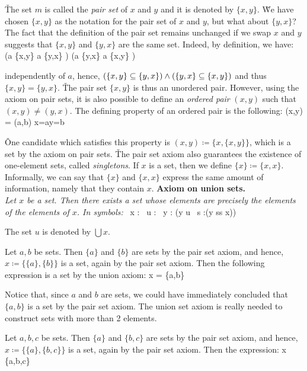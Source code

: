 \v

The set $m$ is called the \emph{pair set} of $x$ and $y$ and it is denoted by $\{x,y\}$. \v

We have chosen $\{x,y\}$ as the notation for the pair set of $x$ and $y$, but what about $\{y,x\}$? The fact that the
definition of the pair set remains unchanged if we swap $x$ and $y$ suggests that $\{x,y\}$ and $\{y,x\}$ are the
same set. Indeed, by definition, we have:
\bse
(a \in \{x,y\} \imp a \in \{y,x\} ) \land (a \in \{y,x\} \imp a \in \{x,y\} )
\ese

independently of $a$, hence, $(\{x,y\} \subseteq \{y,x\}) \land (\{y,x\} \subseteq \{x, y\})$ and thus $\{x,y\} = \{y,x\}$. \v

The pair set $\{x,y\}$ is thus an unordered pair. However, using the axiom on pair sets, it is also possible to
define an \emph{ordered pair} $(x,y)$ such that $(x,y)\neq(y,x)$. The defining property of an ordered pair is the
following:
\bse
(x,y) = (a,b) \eqv x=a\land y=b
\ese

\v

One candidate which satisfies this property is $(x,y)\coloneqq\{x,\{x, y\}\}$, which is a set by the axiom on pair
sets. \v

The pair set axiom also guarantees the existence of one-element sets, called \emph{singletons}. If
$x$ is a set, then we define $\{x\}\coloneqq\{x,x\}$. Informally, we can say that $\{x\}$ and $\{x,x\}$ express the
same amount of information, namely that they contain $x$. \v

\textbf{Axiom on union sets.} \\
\emph{Let $x$ be a set. Then there exists a set whose elements are precisely the elements of the elements of $x$. In
symbols:}
\bse
\forall \, x : \exists \, u : \forall \, y : (y \in u \eqv \exists \, s :(y \in s\land s \in x))
\ese

The set $u$ is denoted by $\bigcup x$.

\be Let $a,b$ be sets. Then $\{a\}$ and $\{b\}$ are sets by the pair set axiom, and hence, $x\coloneqq\{\{a\},\{b\}\}$
is a set, again by the pair set axiom. Then the following expression is a set by the union axiom:
\bse
\bigcup x = \{a,b\}
\ese
\ee

Notice that, since $a$ and $b$ are sets, we could have immediately concluded that $\{a,b\}$ is a set by the pair set
axiom. The union set axiom is really needed to construct sets with more than 2 elements.

\be
Let $a,b,c$ be sets. Then $\{a\}$ and $\{b,c\}$ are sets by the pair set axiom, and hence, $x\coloneqq\{\{a\},\{b,
c\}\}$ is a set, again by the pair set axiom. Then the expression:
\bse
\bigcup x \eqqcolon \{a,b,c\}
\ese

